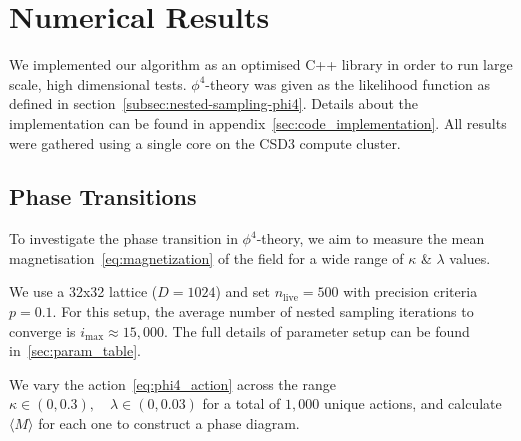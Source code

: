 \documentclass[11pt]{article}
\begin{document}
\section{Numerical Results}\label{sec:numerical_results}
    We implemented our algorithm as an optimised C++ library in order to run large scale, high dimensional tests.
    $\phi^4$-theory was given as the likelihood function as defined in section~\ref{subsec:nested-sampling-phi4}.
    Details about the implementation can be found in appendix~\ref{sec:code_implementation}.
    All results were gathered using a single core on the CSD3 compute cluster.

\subsection{Phase Transitions}\label{subsec:phase_transition}
    To investigate the phase transition in $\phi^4$-theory, we aim to measure the mean magnetisation~\eqref{eq:magnetization}
    of the field for a wide range of $\kappa$ \& $\lambda$ values.

    We use a 32x32 lattice ($D=1024$) and set $n_{\text{live}}=500$ with precision criteria $p=0.1$.
    For this setup, the average number of nested sampling iterations to converge is $i_{\max} \approx 15,000$.
    The full details of parameter setup can be found in~\eqref{sec:param_table}.

    We vary the action~\eqref{eq:phi4_action} across the range $\kappa \in (0, 0.3), \quad \lambda \in (0, 0.03)$ for
    a total of $1,000$ unique actions, and calculate $\langle M \rangle$ for each one to construct a phase diagram.
\end{document}
